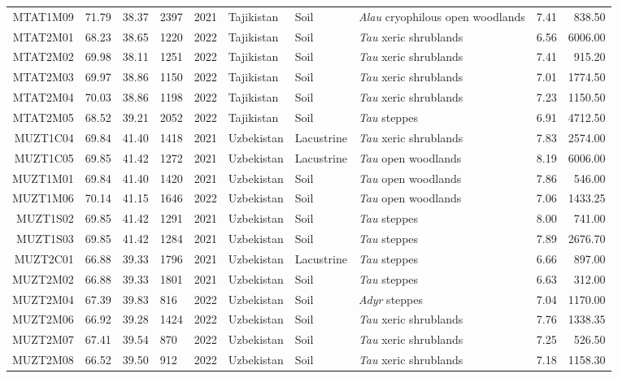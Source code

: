 \begin{table}[ht]
\begin{tabular}{rrrlrlllrr}
  MTAT1M09 & 71.79 & 38.37 & 2397 & 2021 & Tajikistan & Soil & \textit{Alau} cryophilous open woodlands & 7.41 & 838.50 \\ 
  MTAT2M01 & 68.23 & 38.65 & 1220 & 2022 & Tajikistan & Soil & \textit{Tau} xeric shrublands & 6.56 & 6006.00 \\ 
  MTAT2M02 & 69.98 & 38.11 & 1251 & 2022 & Tajikistan & Soil & \textit{Tau} xeric shrublands & 7.41 & 915.20 \\ 
  MTAT2M03 & 69.97 & 38.86 & 1150 & 2022 & Tajikistan & Soil & \textit{Tau} xeric shrublands & 7.01 & 1774.50 \\ 
  MTAT2M04 & 70.03 & 38.86 & 1198 & 2022 & Tajikistan & Soil & \textit{Tau} xeric shrublands & 7.23 & 1150.50 \\ 
  MTAT2M05 & 68.52 & 39.21 & 2052 & 2022 & Tajikistan & Soil & \textit{Tau} steppes & 6.91 & 4712.50 \\ 
  MUZT1C04 & 69.84 & 41.40 & 1418 & 2021 & Uzbekistan & Lacustrine & \textit{Tau} xeric shrublands & 7.83 & 2574.00 \\ 
  MUZT1C05 & 69.85 & 41.42 & 1272 & 2021 & Uzbekistan & Lacustrine & \textit{Tau} open woodlands & 8.19 & 6006.00 \\ 
  MUZT1M01 & 69.84 & 41.40 & 1420 & 2021 & Uzbekistan & Soil & \textit{Tau} open woodlands & 7.86 & 546.00 \\ 
  MUZT1M06 & 70.14 & 41.15 & 1646 & 2022 & Uzbekistan & Soil & \textit{Tau} open woodlands & 7.06 & 1433.25 \\ 
  MUZT1S02 & 69.85 & 41.42 & 1291 & 2021 & Uzbekistan & Soil & \textit{Tau} steppes & 8.00 & 741.00 \\ 
  MUZT1S03 & 69.85 & 41.42 & 1284 & 2021 & Uzbekistan & Soil & \textit{Tau} steppes & 7.89 & 2676.70 \\ 
  MUZT2C01 & 66.88 & 39.33 & 1796 & 2021 & Uzbekistan & Lacustrine & \textit{Tau} steppes & 6.66 & 897.00 \\ 
  MUZT2M02 & 66.88 & 39.33 & 1801 & 2021 & Uzbekistan & Soil & \textit{Tau} steppes & 6.63 & 312.00 \\ 
  MUZT2M04 & 67.39 & 39.83 & 816 & 2022 & Uzbekistan & Soil & \textit{Adyr} steppes & 7.04 & 1170.00 \\ 
  MUZT2M06 & 66.92 & 39.28 & 1424 & 2022 & Uzbekistan & Soil & \textit{Tau} xeric shrublands & 7.76 & 1338.35 \\ 
  MUZT2M07 & 67.41 & 39.54 & 870 & 2022 & Uzbekistan & Soil & \textit{Tau} xeric shrublands & 7.25 & 526.50 \\ 
  MUZT2M08 & 66.52 & 39.50 & 912 & 2022 & Uzbekistan & Soil & \textit{Tau} xeric shrublands & 7.18 & 1158.30 \\ 

\end{tabular}
\end{table}
